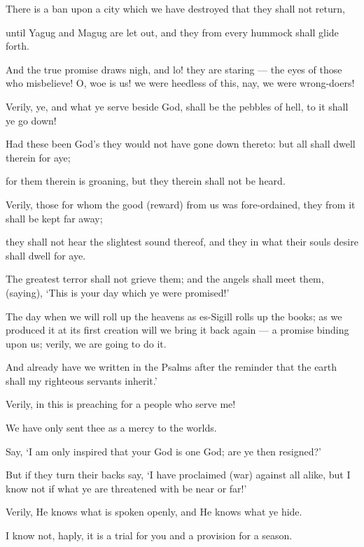 \documentclass[fontsize=14pt, letterpaper, notitlepage, openany, DIV=12]{scrbook} %
\begin{document}
\noindent[21:95]
There is a ban upon a city which we have destroyed that they shall not return,

\noindent[21:96]
until Yagug and Magug are let out, and they from every hummock shall glide forth.

\noindent[21:97]
And the true promise draws nigh, and lo! they are staring --- the eyes of those who
misbelieve! O, woe is us! we were heedless of this, nay, we were wrong-doers!

\noindent[21:98]
Verily, ye, and what ye serve beside God, shall be the pebbles of hell, to it shall ye go
down!

\noindent[21:99]
Had these been God's they would not have gone down thereto: but all shall dwell therein
for aye;

\noindent[21:100]
for them therein is groaning, but they therein shall not be heard.

\noindent[21:101]
Verily, those for whom the good (reward) from us was fore-ordained, they from it shall
be kept far away;

\noindent[21:102]
they shall not hear the slightest sound thereof, and they in what their souls desire shall
dwell for aye.

\noindent[21:103]
The greatest terror shall not grieve them; and the angels shall meet them, (saying), `This
is your day which ye were promised!'

\noindent[21:104]
The day when we will roll up the heavens as es-Sigill rolls up the books; as we produced
it at its first creation will we bring it back again --- a promise binding upon us; verily, we are
going to do it.

\noindent[21:105]
And already have we written in the Psalms after the reminder that the earth shall my
righteous servants inherit.'

\noindent[21:106]
Verily, in this is preaching for a people who serve me!

\noindent[21:107]
We have only sent thee as a mercy to the worlds.

\noindent[21:108]
Say, `I am only inspired that your God is one God; are ye then resigned?'

\noindent[21:109]
But if they turn their backs say, `I have proclaimed (war) against all alike, but I know not
if what ye are threatened with be near or far!'

\noindent[21:110]
Verily, He knows what is spoken openly, and He knows what ye hide.

\noindent[21:111]
I know not, haply, it is a trial for you and a provision for a season.
\end{document}
